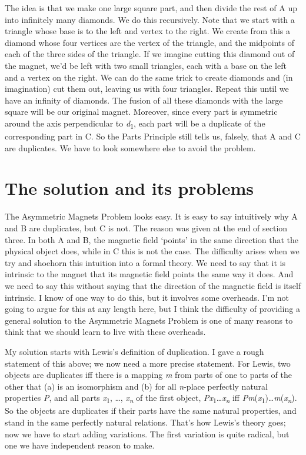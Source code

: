 \documentclass[
  11pt,
  letterpaper,
  DIV=11,
  numbers=noendperiod,
  twoside]{scrartcl}
\begin{document}
The idea is that we make one large square part, and then divide the rest
of A up into infinitely many diamonds. We do this recursively. Note that
we start with a triangle whose base is to the left and vertex to the
right. We create from this a diamond whose four vertices are the vertex
of the triangle, and the midpoints of each of the three sides of the
triangle. If we imagine cutting this diamond out of the magnet, we'd be
left with two small triangles, each with a base on the left and a vertex
on the right. We can do the same trick to create diamonds and (in
imagination) cut them out, leaving us with four triangles. Repeat this
until we have an infinity of diamonds. The fusion of all these diamonds
with the large square will be our original magnet. Moreover, since every
part is symmetric around the axis perpendicular to
\emph{d}\textsubscript{1}, each part will be a duplicate of the
corresponding part in C. So the Parts Principle still tells us, falsely,
that A and C are duplicates. We have to look somewhere else to avoid the
problem.

\section{The solution and its
problems}\label{the-solution-and-its-problems}

The Asymmetric Magnets Problem looks easy. It is easy to say intuitively
why A and B are duplicates, but C is not. The reason was given at the
end of section three. In both A and B, the magnetic field `points' in
the same direction that the physical object does, while in C this is not
the case. The difficulty arises when we try and shoehorn this intuition
into a formal theory. We need to say that it is intrinsic to the magnet
that its magnetic field points the same way it does. And we need to say
this without saying that the direction of the magnetic field is itself
intrinsic. I know of one way to do this, but it involves some overheads.
I'm not going to argue for this at any length here, but I think the
difficulty of providing a general solution to the Asymmetric Magnets
Problem is one of many reasons to think that we should learn to live
with these overheads.

My solution starts with Lewis's definition of duplication. I gave a
rough statement of this above; we now need a more precise statement. For
Lewis, two objects are duplicates iff there is a mapping \emph{m} from
parts of one to parts of the other that (a) is an isomorphism and (b)
for all \emph{n}-place perfectly natural properties \emph{P}, and all
parts \emph{x}\textsubscript{1}, \ldots, \emph{x\textsubscript{n}} of
the first object,
\emph{Px}\textsubscript{1}\ldots{}\emph{x\textsubscript{n}} iff
\emph{Pm}(\emph{x}\textsubscript{1})\ldots{}\emph{m}(\emph{x\textsubscript{n}}).
So the objects are duplicates if their parts have the same natural
properties, and stand in the same perfectly natural relations. That's
how Lewis's theory goes; now we have to start adding variations. The
first variation is quite radical, but one we have independent reason to
make.
\end{document}
